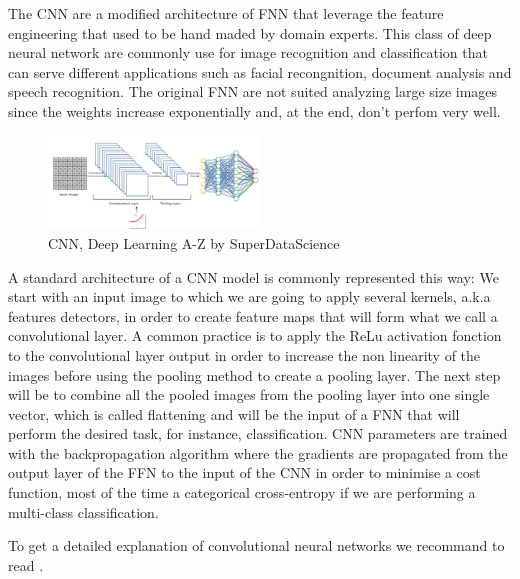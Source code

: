 \documentclass[6pt,letter]{article}\usepackage[]{graphicx}\usepackage[]{color}
\begin{document}
The \ac{CNN} are a modified architecture of \ac{FNN} that leverage the feature engineering that used to be hand maded by domain experts. This class of deep neural network are commonly use for image recognition and classification that can serve different applications such as facial recongnition, document analysis and speech recognition. The original \ac{FNN} are not suited analyzing large size images since the weights increase exponentially and, at the end, don't perfom very well.\\
\begin{figure}
  \begin{center}
    \includegraphics[width=0.5\textwidth]{CNN_process.png}
  \end{center}
  \caption{CNN, Deep Learning A-Z by SuperDataScience}
  \label{fig:attention}
\end{figure}
A standard architecture of a CNN model is commonly represented this way: We start with an input image to which we are going to apply several kernels, a.k.a features detectors, in order to create feature maps that will form what we call a convolutional layer. A common practice is to apply the ReLu activation fonction to the convolutional layer output in order to increase the non linearity of the images before using the pooling method to create a pooling layer. The next step will be to combine all the pooled images from the pooling layer into one single vector, which is called flattening and will be the input of a FNN that will perform the desired task, for instance, classification. CNN parameters are trained with the backpropagation algorithm where the gradients are propagated from the output layer of the FFN to the input of the CNN in order to minimise a cost function, most of the time a categorical cross-entropy if we are performing a multi-class classification. 


To get a detailed explanation of convolutional neural networks we recommand to read \cite[Chapter 9]{Goodfellow-et-al-2016}.\\
\end{document}
